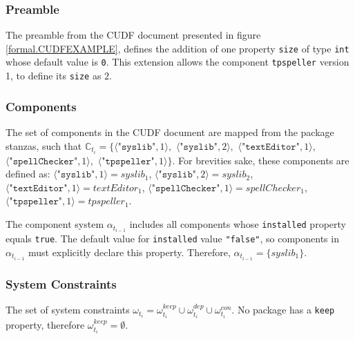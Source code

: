 \subsubsection{Preamble}
The preamble from the CUDF document presented in figure \ref{formal.CUDFEXAMPLE}, 
defines the addition of one property \verb+size+ of type \verb+int+ whose default value is \verb+0+.
This extension allows the component \verb+tpspeller+ version 1, to define its \verb+size+ as $2$.

\subsubsection{Components}
The set of components in the CUDF document are mapped from the package stanzas,
such that $\mathbb{C}_{t_i} = \{\langle \texttt{"syslib"},1 \rangle,$
$ \langle \texttt{"syslib"},2\rangle,$
$  \langle \texttt{"textEditor"},1 \rangle,$
$  \langle \texttt{"spellChecker"},1 \rangle,$
$  \langle \texttt{"tpspeller"},1 \rangle\}$.
For brevities sake, these components are defined as:
$\langle \texttt{"syslib"},1 \rangle = syslib_1$, $\langle \texttt{"syslib"},2\rangle = syslib_2 $,  $\langle \texttt{"textEditor"},1 \rangle =  textEditor_1 $,  
$\langle \texttt{"spellChecker"},1 \rangle =  spellChecker_1 $,  $\langle \texttt{"tpspeller"},1 \rangle =  tpspeller_1 $.

The component system $\alpha_{t_{i-1}}$ includes all components whose \verb+installed+ property equals \verb+true+.
The default value for \verb+installed+ value \verb+"false"+, so components in $\alpha_{t_{i-1}}$ must explicitly declare this property.
Therefore, $\alpha_{t_{i-1}} = \{ syslib_1 \}$.

\subsubsection{System Constraints}
The set of system constraints $\omega_{t_i} = \omega_{t_i}^{keep} \cup \omega_{t_i}^{dep} \cup \omega_{t_i}^{con}$.
No package has a \texttt{keep} property, therefore $\omega_{t_i}^{keep} = \emptyset$.


